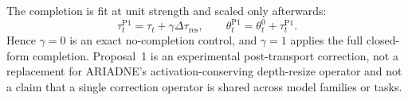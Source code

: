 \documentclass[10pt]{article}
\begin{document}
The completion is fit at unit strength and scaled only afterwards:
\begin{equation}
 \tau_t^{\mathrm{P1}}=\tau_t+\gamma\Delta\tau_{\mathrm{res}},
 \qquad \theta_t^{\mathrm{P1}}=\theta_t^0+\tau_t^{\mathrm{P1}}.
\end{equation}
Hence $\gamma=0$ is an exact no-completion control, and $\gamma=1$ applies the full closed-form completion. Proposal~1 is an experimental post-transport correction, not a replacement for ARIADNE's activation-conserving depth-resize operator and not a claim that a single correction operator is shared across model families or tasks.
\end{document}
